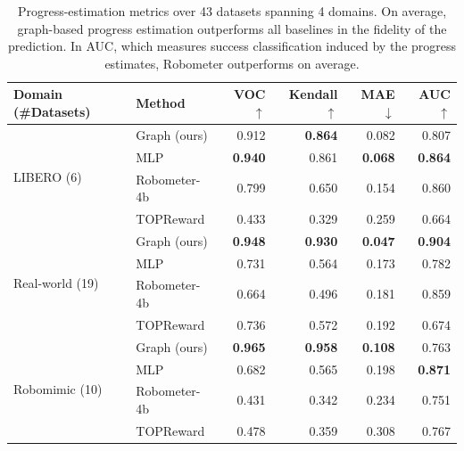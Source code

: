 \documentclass[letterpaper, 10 pt, conference]{ieeeconf}
\begin{document}
\begin{table}
  \vspace{5pt}
  \centering
  \caption{\small Progress-estimation metrics over 43 datasets spanning 4 domains. On average, graph-based progress estimation outperforms all baselines in the fidelity of the prediction. In AUC, which measures success classification induced by the progress estimates, Robometer outperforms on average.}
  \label{tab:progress-by-rubric}
  \setlength{\tabcolsep}{3pt}
  \begin{tabular}{@{}llrrrr@{}}
  \toprule
  Domain (\#Datasets)                          & Method             & VOC $\uparrow$          & Kendall $\uparrow$         & MAE $\downarrow$           & AUC $\uparrow$\\
  \midrule
  \multirow{4}{*}{LIBERO (6)}        & Graph (ours) & 0.912          & \textbf{0.864} & 0.082          & 0.807 \\
                                     & MLP        & \textbf{0.940} & 0.861          & \textbf{0.068} & \textbf{0.864} \\
                                     & Robometer-4b       & 0.799          & 0.650          & 0.154          & 0.860 \\
                                     & TOPReward          & 0.433          & 0.329          & 0.259          & 0.664 \\
  \midrule
  \multirow{4}{*}{Real-world (19)} & Graph (ours) & \textbf{0.948} & \textbf{0.930} & \textbf{0.047} & \textbf{0.904} \\
                                     & MLP        & 0.731          & 0.564          & 0.173          & 0.782 \\
                                     & Robometer-4b       & 0.664          & 0.496          & 0.181          & 0.859 \\
                                     & TOPReward          & 0.736          & 0.572          & 0.192          & 0.674 \\
  \midrule
  \multirow{4}{*}{Robomimic (10)}    & Graph (ours) & \textbf{0.965} & \textbf{0.958} & \textbf{0.108} & 0.763 \\
                                     & MLP        & 0.682          & 0.565          & 0.198          & \textbf{0.871} \\
                                     & Robometer-4b       & 0.431          & 0.342          & 0.234          & 0.751 \\
                                     & TOPReward          & 0.478          & 0.359          & 0.308          & 0.767 \\

\end{tabular}
\end{table}
\end{document}
